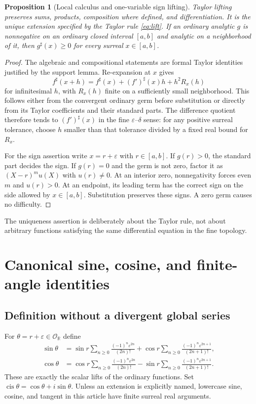 \documentclass[11pt]{article}
\numberwithin{equation}{section}
\newtheorem{proposition}[theorem]{Proposition}
\theoremstyle{definition}
\newcommand{\R}{\mathbb R}
\newcommand{\OO}{\mathcal O}
\newcommand{\eps}{\varepsilon}
\newcommand{\cis}{\operatorname{cis}}
\newcommand{\sh}{^{\sharp}}
\begin{document}
\begin{proposition}[Local calculus and one-variable sign lifting]\label{prop:lift}
Taylor lifting preserves sums, products, composition where defined, and differentiation. It is the unique extension specified by the Taylor rule \eqref{eq:lift}. If an ordinary analytic $g$ is nonnegative on an ordinary closed interval $[a,b]$ and analytic on a neighborhood of it, then $g\sh(x)\ge0$ for every surreal $x\in[a,b]$.
\end{proposition}
\begin{proof}
The algebraic and compositional statements are formal Taylor identities justified by the support lemma. Re-expansion at $x$ gives
\[
 f\sh(x+h)=f\sh(x)+(f')\sh(x)h+h^2R_x(h)
\]
for infinitesimal $h$, with $R_x(h)$ finite on a sufficiently small neighborhood. This follows either from the convergent ordinary germ before substitution or directly from its Taylor coefficients and their standard parts. The difference quotient therefore tends to $(f')\sh(x)$ in the fine $\eps$--$\delta$ sense: for any positive surreal tolerance, choose $h$ smaller than that tolerance divided by a fixed real bound for $R_x$.

For the sign assertion write $x=r+\eps$ with $r\in[a,b]$. If $g(r)>0$, the standard part decides the sign. If $g(r)=0$ and the germ is not zero, factor it as $(X-r)^m u(X)$ with $u(r)\ne0$. At an interior zero, nonnegativity forces even $m$ and $u(r)>0$. At an endpoint, its leading term has the correct sign on the side allowed by $x\in[a,b]$. Substitution preserves these signs. A zero germ causes no difficulty.
\end{proof}
The uniqueness assertion is deliberately about the Taylor rule, not about arbitrary functions satisfying the same differential equation in the fine topology.

\section{Canonical sine, cosine, and finite-angle identities}\label{sec:finite}
\subsection{Definition without a divergent global series}
For $\theta=r+\eps\in\OO_{\R}$ define
\begin{align}
 \sin\theta&=\sin r\sum_{n\ge0}\frac{(-1)^n\eps^{2n}}{(2n)!}
 +\cos r\sum_{n\ge0}\frac{(-1)^n\eps^{2n+1}}{(2n+1)!},\\
 \cos\theta&=\cos r\sum_{n\ge0}\frac{(-1)^n\eps^{2n}}{(2n)!}
 -\sin r\sum_{n\ge0}\frac{(-1)^n\eps^{2n+1}}{(2n+1)!}.
 \label{eq:sincos}
\end{align}
These are exactly the scalar lifts of the ordinary functions. Set $\cis\theta=\cos\theta+i\sin\theta$. Unless an extension is explicitly named, lowercase sine, cosine, and tangent in this article have finite surreal real arguments.
\end{document}
